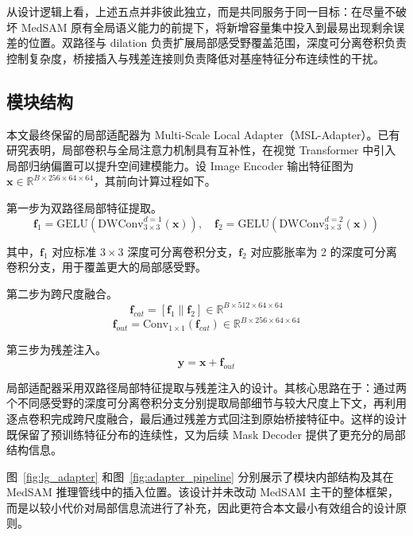 从设计逻辑上看，上述五点并非彼此独立，而是共同服务于同一目标：在尽量不破坏 MedSAM 原有全局语义能力的前提下，将新增容量集中投入到最易出现剩余误差的位置。双路径与 dilation 负责扩展局部感受野覆盖范围，深度可分离卷积负责控制复杂度，桥接插入与残差连接则负责降低对基座特征分布连续性的干扰。

\subsection{模块结构}

本文最终保留的局部适配器为 Multi-Scale Local Adapter（MSL-Adapter）。已有研究表明，局部卷积与全局注意力机制具有互补性\cite{dai2021coatnet}，在视觉 Transformer 中引入局部归纳偏置可以提升空间建模能力\cite{li2021localvit}。设 Image Encoder 输出特征图为 $\mathbf{x} \in \mathbb{R}^{B \times 256 \times 64 \times 64}$，其前向计算过程如下。

第一步为双路径局部特征提取。
\begin{equation}
\mathbf{f}_1 = \text{GELU}\left(\text{DWConv}_{3 \times 3}^{d=1}(\mathbf{x})\right), \quad
\mathbf{f}_2 = \text{GELU}\left(\text{DWConv}_{3 \times 3}^{d=2}(\mathbf{x})\right)
\end{equation}

其中，$\mathbf{f}_1$ 对应标准 $3\times3$ 深度可分离卷积分支，$\mathbf{f}_2$ 对应膨胀率为 2 的深度可分离卷积分支，用于覆盖更大的局部感受野。

第二步为跨尺度融合。
\begin{equation}
\mathbf{f}_{cat} = [\mathbf{f}_1 \| \mathbf{f}_2] \in \mathbb{R}^{B \times 512 \times 64 \times 64}
\end{equation}
\begin{equation}
\mathbf{f}_{out} = \text{Conv}_{1 \times 1}(\mathbf{f}_{cat}) \in \mathbb{R}^{B \times 256 \times 64 \times 64}
\end{equation}

第三步为残差注入。
\begin{equation}
\mathbf{y} = \mathbf{x} + \mathbf{f}_{out}
\label{eq:lg_residual}
\end{equation}

局部适配器采用双路径局部特征提取与残差注入的设计。其核心思路在于：通过两个不同感受野的深度可分离卷积分支分别提取局部细节与较大尺度上下文，再利用逐点卷积完成跨尺度融合，最后通过残差方式回注到原始桥接特征中。这样的设计既保留了预训练特征分布的连续性，又为后续 Mask Decoder 提供了更充分的局部结构信息。

图~\ref{fig:lg_adapter} 和图~\ref{fig:adapter_pipeline} 分别展示了模块内部结构及其在 MedSAM 推理管线中的插入位置。该设计并未改动 MedSAM 主干的整体框架，而是以较小代价对局部信息流进行了补充，因此更符合本文最小有效组合的设计原则。

